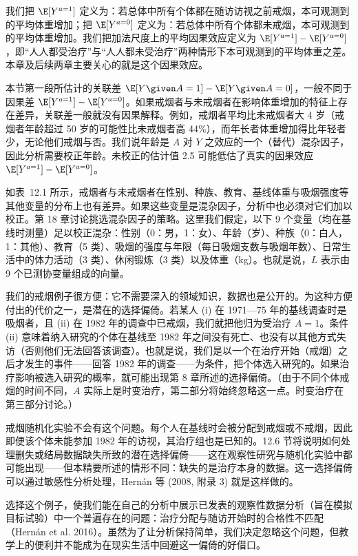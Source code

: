 我们把 $\E[Y^{a=1}]$ 定义为：若总体中所有个体都在随访访视之前戒烟，本可观测到的平均体重增加；把 $\E[Y^{a=0}]$ 定义为：若总体中所有个体都未戒烟，本可观测到的平均体重增加。我们把加法尺度上的平均因果效应定义为 $\E[Y^{a=1}]-\E[Y^{a=0}]$，即“人人都受治疗”与“人人都未受治疗”两种情形下本可观测到的平均体重之差。本章及后续两章主要关心的就是这个因果效应。

本节第一段所估计的关联差 $\E[Y\given A=1]-\E[Y\given A=0]$，一般不同于因果差 $\E[Y^{a=1}]-\E[Y^{a=0}]$。如果戒烟者与未戒烟者在影响体重增加的特征上存在差异，关联差一般就没有因果解释。例如，戒烟者平均比未戒烟者大 4 岁（戒烟者年龄超过 50 岁的可能性比未戒烟者高 44\%），而年长者体重增加得比年轻者少，无论他们戒烟与否。我们说年龄是 $A$ 对 $Y$ 之效应的一个（替代）混杂因子，因此分析需要校正年龄。未校正的估计值 2.5 可能低估了真实的因果效应 $\E[Y^{a=1}]-\E[Y^{a=0}]$。

如表~12.1 所示，戒烟者与未戒烟者在性别、种族、教育、基线体重与吸烟强度等其他变量的分布上也有差异。如果这些变量是混杂因子，分析中也必须对它们加以校正。第 18 章讨论挑选混杂因子的策略。这里我们假定，以下 9 个变量（均在基线时测量）足以校正混杂：性别（0：男，1：女）、年龄（岁）、种族（0：白人，1：其他）、教育（5 类）、吸烟的强度与年限（每日吸烟支数与吸烟年数）、日常生活中的体力活动（3 类）、休闲锻炼（3 类）以及体重（kg）。也就是说，$L$ 表示由 9 个已测协变量组成的向量。

\renewcommand{\FPname}{精要（Fine Point）}
\begin{finepoint}[树立一个坏榜样]
我们的戒烟例子很方便：它不需要深入的领域知识，数据也是公开的。为这种方便付出的代价之一，是潜在的选择偏倚。若某人 (i) 在 1971—75 年的基线调查时是吸烟者，且 (ii) 在 1982 年的调查中已戒烟，我们就把他归为受治疗 $A=1$。条件 (ii) 意味着纳入研究的个体在基线至 1982 年之间没有死亡、也没有以其他方式失访（否则他们无法回答该调查）。也就是说，我们是以一个在治疗开始（戒烟）之后才发生的事件——回答 1982 年的调查——为条件，把个体选入研究的。如果治疗影响被选入研究的概率，就可能出现第 8 章所述的选择偏倚。（由于不同个体戒烟的时间不同，$A$ 实际上是时变治疗，第二部分将始终忽略这一点。时变治疗在第三部分讨论。）

戒烟随机化实验不会有这个问题。每个人在基线时会被分配到戒烟或不戒烟，因此即便该个体未能参加 1982 年的访视，其治疗组也是已知的。12.6 节将说明如何处理删失或结局数据缺失所致的潜在选择偏倚——这在观察性研究与随机化实验中都可能出现——但本精要所述的情形不同：缺失的是治疗本身的数据。这一选择偏倚可以通过敏感性分析处理，Hernán 等 (2008, 附录 3) 就是这样做的。

选择这个例子，使我们能在自己的分析中展示已发表的观察性数据分析（旨在模拟目标试验）中一个普遍存在的问题：治疗分配与随访开始时的合格性不匹配（Hernán et al. 2016）。虽然为了让分析保持简单，我们决定忽略这个问题，但教学上的便利并不能成为在现实生活中回避这一偏倚的好借口。
\end{finepoint}
\renewcommand{\FPname}{精要}

